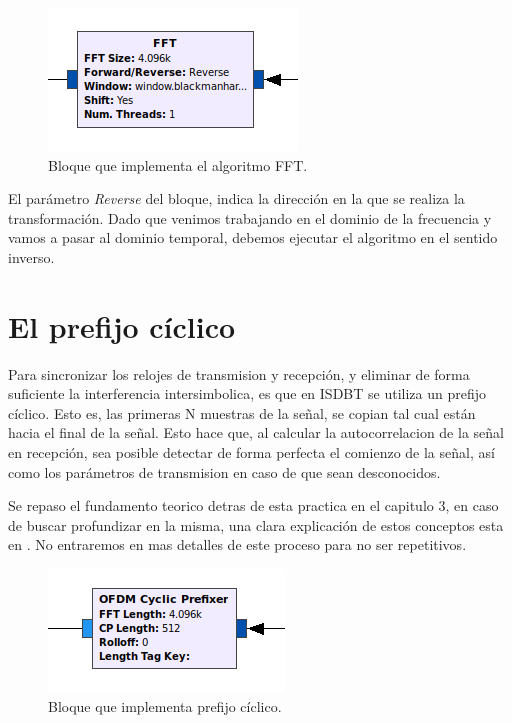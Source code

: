 \begin{figure}[!h]
	\centering
	\includegraphics[scale=0.5]{figuras/cap05/fft}
	\caption{\label{f:fft} Bloque que implementa el algoritmo FFT.}
\end{figure}

El parámetro \textit{Reverse} del bloque, indica la dirección en la que se realiza la transformación. Dado que venimos trabajando en el dominio de la frecuencia y vamos a pasar al dominio temporal, debemos ejecutar el algoritmo en el sentido inverso.

\section{El prefijo cíclico}

Para sincronizar los relojes de transmision y recepción, y eliminar de forma suficiente la interferencia intersimbolica, es que en ISDBT se utiliza un prefijo cíclico. Esto es, las primeras N muestras de la señal, se copian tal cual están hacia el final de la señal. Esto hace que, al calcular la autocorrelacion de la señal en recepción, sea posible detectar de forma perfecta el comienzo de la señal, así como los parámetros de transmision en caso de que sean desconocidos. 

Se repaso el fundamento teorico detras de esta practica en el capitulo 3, en caso de buscar profundizar en la misma, una clara explicación de estos conceptos esta en \cite{gr-isdbt}. No entraremos en mas detalles de este proceso para no ser repetitivos.

\begin{figure}[!h]
	\centering
	\includegraphics[scale=0.5]{figuras/cap05/cp}
	\caption{\label{f:cp} Bloque que implementa prefijo cíclico.}
\end{figure}

